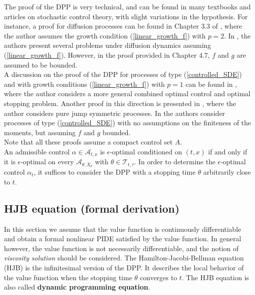The proof of the DPP is very technical, and can be found in many textbooks and articles on stochastic control theory, with slight variations in the hypothesis.   
For instance, a proof for diffusion processes can be found in Chapter 3.3 of \cite{Pham}, 
where the author assumes the growth condition (\ref{linear_growth_f}) with $p=2$. 
In \cite{FlemingSoner}, the authors present several problems under diffusion dynamics assuming (\ref{linear_growth_f}).
However, in the proof provided in Chapter 4.7, $f$ and $g$ are assumed to be bounded. \\ 
A discussion on the proof of the DPP for processes of type (\ref{controlled_SDE}) and with growth conditions (\ref{linear_growth_f}) with $p=1$ can be found in \cite{Ph98}, 
where the author considers a more general combined optimal control and optimal stopping problem. 
Another proof in this direction is presented in \cite{Zalin11}, where the author considers pure jump symmetric processes. 
In \cite{Gol16} the authors consider processes of type (\ref{controlled_SDE}) with no assumptions on the finiteness of the moments, but assuming $f$ and $g$ bounded.\\
Note that all these proofs assume a compact control set $A$.\\

An admissible control $\alpha \in \mathcal{A}_{t,x}$ is $\epsilon$-optimal conditioned on $(t,x)$ if and only if it is $\epsilon$-optimal 
on every $\mathcal{A}_{\theta, X_{\theta}}$ with 
$\theta \in \mathcal{T}_{t,\tau}$. In order to determine the $\epsilon$-optimal control $\alpha_t$, it suffices to consider the DPP with a stopping time $\theta$
arbitrarily close to $t$.

\subsection{HJB equation (formal derivation)}

In this section we assume that the value function is continuously differentiable and obtain a formal nonlinear PIDE satisfied by the value function.
In general however, the value function is not necessarily differentiable, and the notion of \emph{viscosity solution} should be considered.
The Hamilton-Jacobi-Bellman equation (HJB) is the infinitesimal version of the DPP. It describes the local behavior of the value function when the stopping time $\theta$ converges to $t$. 
The HJB equation is also called \textbf{dynamic programming equation}.
\newline

